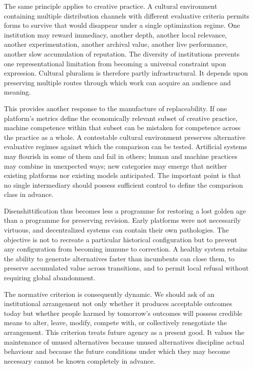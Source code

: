 \documentclass[11pt]{article}
\begin{document}
The same principle applies to creative practice. A cultural environment containing multiple distribution channels with different evaluative criteria permits forms to survive that would disappear under a single optimization regime. One institution may reward immediacy, another depth, another local relevance, another experimentation, another archival value, another live performance, another slow accumulation of reputation. The diversity of institutions prevents one representational limitation from becoming a universal constraint upon expression. Cultural pluralism is therefore partly infrastructural. It depends upon preserving multiple routes through which work can acquire an audience and meaning.

This provides another response to the manufacture of replaceability. If one platform's metrics define the economically relevant subset of creative practice, machine competence within that subset can be mistaken for competence across the practice as a whole. A contestable cultural environment preserves alternative evaluative regimes against which the comparison can be tested. Artificial systems may flourish in some of them and fail in others; human and machine practices may combine in unexpected ways; new categories may emerge that neither existing platforms nor existing models anticipated. The important point is that no single intermediary should possess sufficient control to define the comparison class in advance.

Disenshittification thus becomes less a programme for restoring a lost golden age than a programme for preserving revision. Early platforms were not necessarily virtuous, and decentralized systems can contain their own pathologies. The objective is not to recreate a particular historical configuration but to prevent any configuration from becoming immune to correction. A healthy system retains the ability to generate alternatives faster than incumbents can close them, to preserve accumulated value across transitions, and to permit local refusal without requiring global abandonment.

The normative criterion is consequently dynamic. We should ask of an institutional arrangement not only whether it produces acceptable outcomes today but whether people harmed by tomorrow's outcomes will possess credible means to alter, leave, modify, compete with, or collectively renegotiate the arrangement. This criterion treats future agency as a present good. It values the maintenance of unused alternatives because unused alternatives discipline actual behaviour and because the future conditions under which they may become necessary cannot be known completely in advance.
\end{document}
